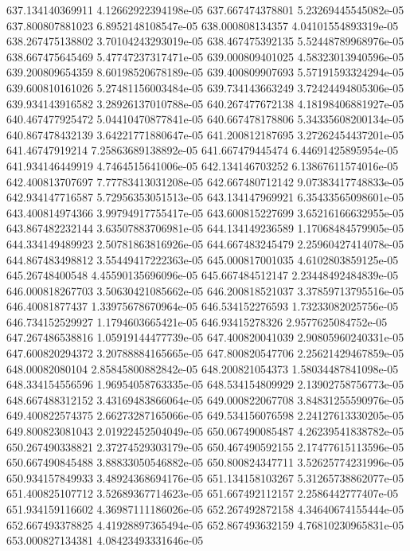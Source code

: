 {637.134140369911 4.12662922394198e-05
637.667474378801 5.23269445545082e-05
637.800807881023 6.8952148108547e-05
638.000808134357 4.04101554893319e-05
638.267475138802 3.70104243293019e-05
638.467475392135 5.52448789968976e-05
638.667475645469 5.47747237317471e-05
639.000809401025 4.58323013940596e-05
639.200809654359 8.60198520678189e-05
639.400809907693 5.57191593324294e-05
639.600810161026 5.27481156003484e-05
639.734143663249 3.72424494805306e-05
639.934143916582 3.28926137010788e-05
640.267477672138 4.18198406881927e-05
640.467477925472 5.04410470877841e-05
640.667478178806 5.34335608200134e-05
640.867478432139 3.64221771880647e-05
641.200812187695 3.27262454437201e-05
641.46747919214 7.25863689138892e-05
641.667479445474 6.44691425895954e-05
641.934146449919 4.7464515641006e-05
642.134146703252 6.13867611574016e-05
642.400813707697 7.77783413031208e-05
642.667480712142 9.07383417748833e-05
642.934147716587 5.72956353051513e-05
643.134147969921 6.35433565098601e-05
643.400814974366 3.99794917755417e-05
643.600815227699 3.65216166632955e-05
643.867482232144 3.63507883706981e-05
644.134149236589 1.17068484579905e-05
644.334149489923 2.50781863816926e-05
644.667483245479 2.25960427414078e-05
644.867483498812 3.55449417222363e-05
645.000817001035 4.6102803859125e-05
645.26748400548 4.45590135696096e-05
645.667484512147 2.23448492484839e-05
646.000818267703 3.50630421085662e-05
646.200818521037 3.37859713795516e-05
646.40081877437 1.33975678670964e-05
646.534152276593 1.73233082025756e-05
646.734152529927 1.1794603665421e-05
646.93415278326 2.9577625084752e-05
647.267486538816 1.05919144477739e-05
647.400820041039 2.90805960240331e-05
647.600820294372 3.20788884165665e-05
647.800820547706 2.25621429467859e-05
648.00082080104 2.85845800882842e-05
648.200821054373 1.58034487841098e-05
648.334154556596 1.96954058763335e-05
648.534154809929 2.13902758756773e-05
648.667488312152 3.43169483866064e-05
649.000822067708 3.84831255590976e-05
649.400822574375 2.66273287165066e-05
649.534156076598 2.24127613330205e-05
649.800823081043 2.01922452504049e-05
650.067490085487 4.26239541838782e-05
650.267490338821 2.37274529303179e-05
650.467490592155 2.17477615113596e-05
650.667490845488 3.88833050546882e-05
650.800824347711 3.52625774231996e-05
650.934157849933 3.48924368694176e-05
651.134158103267 5.31265738862077e-05
651.400825107712 3.52689367714623e-05
651.667492112157 2.2586442777407e-05
651.934159116602 4.36987111186026e-05
652.267492872158 4.34640674155444e-05
652.667493378825 4.41928897365494e-05
652.867493632159 4.76810230965831e-05
653.000827134381 4.08423493331646e-05
}
